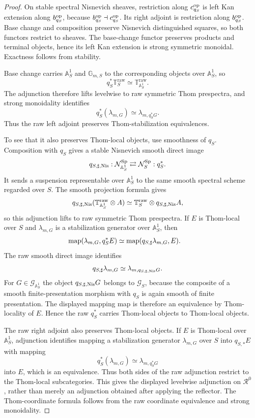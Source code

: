 \begin{proof}
On stable spectral Nisnevich sheaves, restriction along
\(c_{q_S}^{\mathrm{op}}\) is left Kan extension along \(b_{q_S}^{\mathrm{op}}\), because
\(b_{q_S}^{\mathrm{op}}\dashv c_{q_S}^{\mathrm{op}}\).  Its right adjoint is restriction along
\(b_{q_S}^{\mathrm{op}}\).  Base change and composition preserve Nisnevich
distinguished squares, so both functors restrict to sheaves.  The base-change
functor preserves products and terminal objects, hence its left Kan extension
is strong symmetric monoidal.  Exactness follows from stability.

Base change carries \(\mathbb A^1_S\) and \(\mathbb G_{m,S}\) to the
corresponding objects over \(\mathbb A^1_S\), so
\[
  q_S^*\mathbb T_S^{\mathrm{raw}}
  \simeq
  \mathbb T_{\mathbb A^1_S}^{\mathrm{raw}}.
\]
The adjunction therefore lifts levelwise to raw symmetric Thom prespectra, and
strong monoidality identifies
\[
  q_S^*(\lambda_{m,G})
  \simeq
  \lambda_{m,q_S^*G}.
\]
Thus the raw left adjoint preserves Thom-stabilization equivalences.

To see that it also preserves Thom-local objects, use smoothness of
$q_S$.  Composition with $q_S$ gives a stable Nisnevich smooth direct image
\[
  q_{S,\sharp,\mathrm{Nis}}:
  \mathcal N_{\mathbb A^1_S}^{\mathrm{Sp}}
  \rightleftarrows
  \mathcal N_S^{\mathrm{Sp}}:
  q_S^*.
\]
It sends a suspension representable over $\mathbb A^1_S$ to the same smooth
spectral scheme regarded over $S$.  The smooth projection formula gives
\[
  q_{S,\sharp,\mathrm{Nis}}
  (\mathbb T_{\mathbb A^1_S}^{\mathrm{raw}}\otimes A)
  \simeq
  \mathbb T_S^{\mathrm{raw}}\otimes q_{S,\sharp,\mathrm{Nis}}A,
\]
so this adjunction lifts to raw symmetric Thom prespectra.  If $E$ is
Thom-local over $S$ and $\lambda_{m,G}$ is a stabilization generator over
$\mathbb A^1_S$, then
\[
\begin{aligned}
  \operatorname{map}(\lambda_{m,G},q_S^*E)
  &\simeq
  \operatorname{map}(q_{S,\sharp}\lambda_{m,G},E).
\end{aligned}
\]
The raw smooth direct image identifies
\[
  q_{S,\sharp}\lambda_{m,G}
  \simeq
  \lambda_{m,q_{S,\sharp,\mathrm{Nis}}G}.
\]
For $G\in\mathcal G_{\mathbb A^1_S}$ the object
$q_{S,\sharp,\mathrm{Nis}}G$ belongs to $\mathcal G_S$, because the composite of a
smooth finite-presentation morphism with $q_S$ is again smooth of finite
presentation.  The displayed mapping map is therefore an equivalence by
Thom-locality of $E$.  Hence the raw $q_S^*$ carries Thom-local objects to
Thom-local objects.

The raw right adjoint also preserves Thom-local objects.  If $E$ is Thom-local
over $\mathbb A^1_S$, adjunction identifies mapping a stabilization generator
$\lambda_{m,G}$ over $S$ into $q_{S,*}E$ with mapping
\[
  q_S^*(\lambda_{m,G})
  \simeq
  \lambda_{m,q_S^*G}
\]
into $E$, which is an equivalence.  Thus both sides of the raw adjunction
restrict to the Thom-local subcategories.  This gives the displayed levelwise
adjunction on $\mathcal R^0$, rather than merely an adjunction obtained after
applying the reflector.  The Thom-coordinate formula follows from the raw
coordinate equivalence and strong monoidality.
\end{proof}

